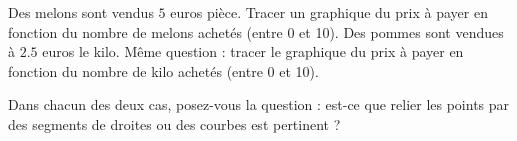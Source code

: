 
\begin{exercice}\label{exoSeconde-0059}

Des melons sont vendus $5$ euros pièce. Tracer un graphique du prix à payer en fonction du nombre de melons achetés (entre 0 et 10). Des pommes sont vendues à \( 2.5\) euros le kilo. Même question : tracer le graphique du prix à payer en fonction du nombre de kilo achetés (entre 0 et 10).

Dans chacun des deux cas, posez-vous la question : est-ce que relier les points par des segments de droites ou des courbes est pertinent ?

\end{exercice}
